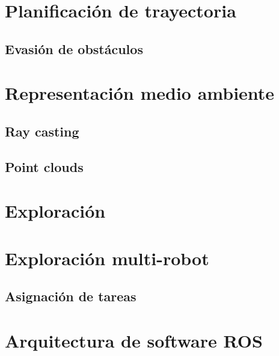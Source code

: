 \lipsum[2-4]

\section{Planificación de trayectoria}

\lipsum[2-4]

\subsection{Evasión de obstáculos}

\lipsum[2-4]

\section{Representación medio ambiente}

\lipsum[2-4]

\subsection{Ray casting}

\lipsum[2-4]

\subsection{Point clouds}

\lipsum[2-4]

\section{Exploración}

\lipsum[2-4]

\section{Exploración multi-robot}
\lipsum[2-4]

\subsection{Asignación de tareas}
\lipsum[2-4]

\section{Arquitectura de software ROS}

\lipsum[2-4]


